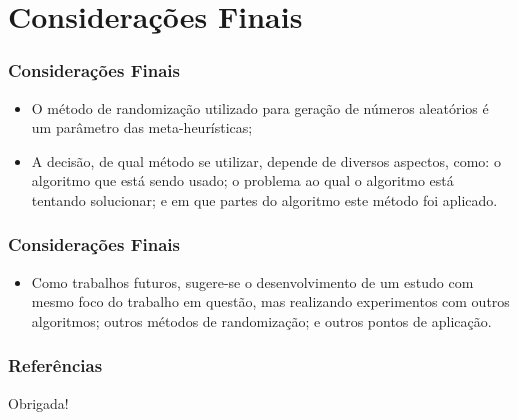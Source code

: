 \documentclass{beamer}
\newcommand{\source}[1]{\vspace{-6pt} \caption*{Fonte: {#1}} }
\begin{document}

\section{Considerações Finais}

\begin{frame}
\frametitle{Considerações Finais}
\begin{itemize}
    \item O método de randomização utilizado para geração de números aleatórios é um parâmetro das meta-heurísticas; 
    \item A decisão, de qual método se utilizar, depende de diversos aspectos, como: o algoritmo que está sendo usado; o problema ao qual o algoritmo está tentando solucionar; e em que partes do algoritmo este método foi aplicado.
\end{itemize}
\end{frame}

\begin{frame}
\frametitle{Considerações Finais}
\begin{itemize}
    \item Como trabalhos futuros, sugere-se o desenvolvimento de um estudo com mesmo foco do trabalho em questão, mas realizando experimentos com outros algoritmos; outros métodos de randomização; e outros pontos de aplicação.
\end{itemize}
\end{frame}

\begin{frame}[allowframebreaks]
\frametitle{Referências}
\nocite{*}
\printbibliography
\end{frame}

\begin{frame}
    \begin{center}
        \Huge Obrigada!
    \end{center}
\end{frame}

\begin{frame}
\titlepage
\end{frame}
\end{document}
